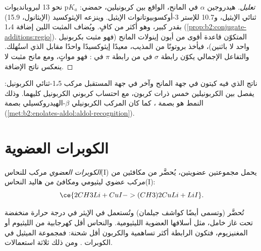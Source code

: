 \begin{proof}[تعليل]
هيدروجين $\alpha$ في المانح، الواقع بين كربونيلين، حمضي: $\mathrm pK_a$ نحو 13 لبروبانديوات
ثنائي الإيثيل، و10.7 للإستر 3-أوكسوبيوتانوات الإيثيل. وينزعه الإيثوكسيد (الإيثانول، 15.9) بقدر كبير، وهو
أكثر من كافٍ. ويُضاف  المثبت اللين إضافة 1،4
(\cref{prop:b2:conjugate-additions:regio}).  المتكوّن قاعدة أقوى من أيون إينولات
المانح (فهو مثبت بكربونيل واحد لا باثنين)، فيأخذ بروتونًا من المذيب، معيدًا
إيثوكسيدًا واحدًا مقابل الذي استُهلك. والتفاعل الإجمالي يكوّن رابطة $\sigma$ في  من رابطة
$\pi$ في : فهو مواتٍ، ومع مانح مثبت لا ينعكس ناتج الإضافة.
\end{proof}

ناتج  الذي فيه كيتون في جهة المانح وآخر في جهة المستقبل مركب 1،5-ثنائي الكربونيل:
يفصل بين الكربونيلين خمس ذرات كربون، مع احتساب كربوني الكربونيل كليهما. وذلك النمط هو
بصمة ، كما كان المركب الكربونيلي $\beta$-الهيدروكسيلي بصمة 
(\cref{met:b2:enolates-aldol:aldol-recognition}).

\section{الكوبرات العضوية}

\begin{definition}\label{def:b2:conjugate-additions:cuprate}
\emph{الكوبرات العضوي}  مركب للنحاس(I) يحمل مجموعتين
عضويتين، يُحضَّر من مكافئين من مركب عضوي ليثيومي ومكافئ من هاليد النحاس(I):
\begin{equation*}
\ce{2 CH3Li + CuI -> (CH3)2CuLi + LiI}.
\end{equation*}
\end{definition}

تُحضَّر  (وتسمى أيضًا كواشف جيلمان) وتُستعمل في الإيثر في درجة حرارة منخفضة تحت
غاز خامل، مثل أسلافها العضوية الليثيومية. والنحاس أقل كهرجابية من الليثيوم أو
المغنيزيوم، فتكون الرابطة  أكثر تساهمية والكربون أقل شحنة: فمجموعة الميثيل في
الكوبرات . ومن ذلك ثلاثة استعمالات.

